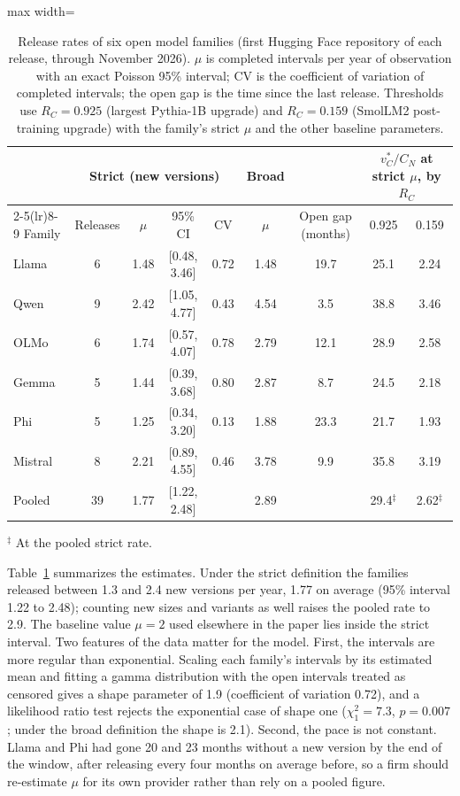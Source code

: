 \documentclass[preprint,12pt,authoryear]{elsarticle}
\begin{document}
\begin{table}[t]
\centering
\caption{Release rates of six open model families (first Hugging Face repository of each release, through November 2026). $\mu$ is completed intervals per year of observation with an exact Poisson 95\% interval; CV is the coefficient of variation of completed intervals; the open gap is the time since the last release. Thresholds use $R_C=0.925$ (largest Pythia-1B upgrade) and $R_C=0.159$ (SmolLM2 post-training upgrade) with the family's strict $\mu$ and the other baseline parameters.}\label{tab:releases}
\small
\begin{adjustbox}{max width=\textwidth}
\begin{tabular}{lcccccccc}
\toprule
 & \multicolumn{4}{c}{Strict (new versions)} & Broad & & \multicolumn{2}{c}{$v^*_C/C_N$ at strict $\mu$, by $R_C$}\\
\cmidrule(lr){2-5}\cmidrule(lr){8-9}
Family & Releases & $\mu$ & 95\% CI & CV & $\mu$ & Open gap (months) & 0.925 & 0.159\\
\midrule
Llama & 6 & 1.48 & [0.48, 3.46] & 0.72 & 1.48 & 19.7 & 25.1 & 2.24\\
Qwen & 9 & 2.42 & [1.05, 4.77] & 0.43 & 4.54 & 3.5 & 38.8 & 3.46\\
OLMo & 6 & 1.74 & [0.57, 4.07] & 0.78 & 2.79 & 12.1 & 28.9 & 2.58\\
Gemma & 5 & 1.44 & [0.39, 3.68] & 0.80 & 2.87 & 8.7 & 24.5 & 2.18\\
Phi & 5 & 1.25 & [0.34, 3.20] & 0.13 & 1.88 & 23.3 & 21.7 & 1.93\\
Mistral & 8 & 2.21 & [0.89, 4.55] & 0.46 & 3.78 & 9.9 & 35.8 & 3.19\\
\midrule
Pooled & 39 & 1.77 & [1.22, 2.48] & & 2.89 & & 29.4$^\ddagger$ & 2.62$^\ddagger$\\
\bottomrule
\end{tabular}
\end{adjustbox}

\smallskip\footnotesize $^\ddagger$ At the pooled strict rate.
\end{table}

Table~\ref{tab:releases} summarizes the estimates. Under the strict definition the families released between 1.3 and 2.4 new versions per year, 1.77 on average (95\% interval 1.22 to 2.48); counting new sizes and variants as well raises the pooled rate to 2.9. The baseline value $\mu=2$ used elsewhere in the paper lies inside the strict interval. Two features of the data matter for the model. First, the intervals are more regular than exponential. Scaling each family's intervals by its estimated mean and fitting a gamma distribution with the open intervals treated as censored gives a shape parameter of 1.9 (coefficient of variation 0.72), and a likelihood ratio test rejects the exponential case of shape one ($\chi^2_1=7.3$, $p=0.007$; under the broad definition the shape is 2.1). Second, the pace is not constant. Llama and Phi had gone 20 and 23 months without a new version by the end of the window, after releasing every four months on average before, so a firm should re-estimate $\mu$ for its own provider rather than rely on a pooled figure.
\end{document}
